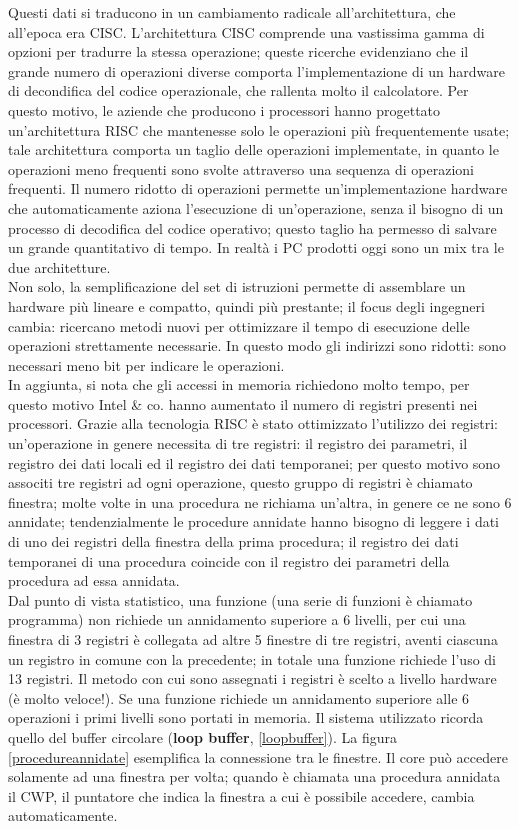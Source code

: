 \documentclass{article}
\begin{document}
Questi dati si traducono in un cambiamento radicale all'architettura, che all'epoca era CISC. L'architettura CISC comprende una vastissima gamma di opzioni per tradurre la stessa operazione; queste ricerche evidenziano che il grande numero di operazioni diverse comporta l'implementazione di un hardware di decondifica del codice operazionale, che rallenta molto il calcolatore. Per questo motivo, le aziende che producono i processori hanno progettato un'architettura RISC che mantenesse solo le operazioni più frequentemente usate; tale architettura comporta un taglio delle operazioni implementate, in quanto le operazioni meno frequenti sono svolte attraverso una sequenza di operazioni frequenti. Il numero ridotto di operazioni permette un'implementazione hardware che automaticamente aziona l'esecuzione di un'operazione, senza il bisogno di un processo di decodifica del codice operativo; questo taglio ha permesso di salvare un grande quantitativo di tempo. In realtà i PC prodotti oggi sono un mix tra le due architetture.\\
Non solo, la semplificazione del set di istruzioni permette di assemblare un hardware più lineare e compatto, quindi più prestante; il focus degli ingegneri cambia: ricercano metodi nuovi per ottimizzare il tempo di esecuzione delle operazioni strettamente necessarie. In questo modo gli indirizzi sono ridotti: sono necessari meno bit per indicare le operazioni.\\

In aggiunta, si nota che gli accessi in memoria richiedono molto tempo, per questo motivo Intel \& co. hanno aumentato il numero di registri presenti nei processori. Grazie alla tecnologia RISC è stato ottimizzato l'utilizzo dei registri: un'operazione in genere necessita di tre registri: il registro dei parametri, il registro dei dati locali ed il registro dei dati temporanei; per questo motivo sono associti tre registri ad ogni operazione, questo gruppo di registri è chiamato finestra; molte volte in una procedura ne richiama un'altra, in genere ce ne sono 6 annidate; tendenzialmente le procedure annidate hanno bisogno di leggere i dati di uno dei registri della finestra della prima procedura; il registro dei dati temporanei di una procedura coincide con il registro dei parametri della procedura ad essa annidata.\\

Dal punto di vista statistico, una funzione (una serie di funzioni è chiamato programma) non richiede un annidamento superiore a 6 livelli, per cui una finestra di 3 registri è collegata ad altre 5 finestre di tre registri, aventi ciascuna un registro in comune con la precedente; in totale una funzione richiede l'uso di 13 registri. Il metodo con cui sono assegnati i registri è scelto a livello hardware (è molto veloce!). Se una funzione richiede un annidamento superiore alle 6 operazioni i primi livelli sono portati in memoria. Il sistema utilizzato ricorda quello del buffer circolare (\textbf{loop buffer}, \autoref{loopbuffer}). La figura \ref{procedureannidate} esemplifica la connessione tra le finestre. Il core può accedere solamente ad una finestra per volta; quando è chiamata una procedura annidata il CWP, il puntatore che indica la finestra a cui è possibile accedere, cambia automaticamente.
\end{document}
